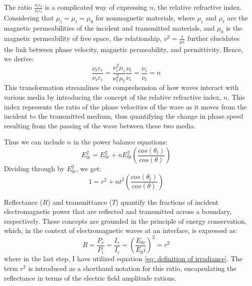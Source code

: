 The ratio $\frac{\nu_t\varepsilon_t}{\nu_i\varepsilon_i}$ is a complicated way of expressing $n$, the relative refractive index. Considering that $\mu_i = \mu_t = \mu_0$ for nonmagnetic materials, where $\mu_i$ and $\mu_t$ are the magnetic permeabilities of the incident and transmitted materials, and $\mu_0$ is the magnetic permeability of free space, the relationship, $\nu^2 = \frac{1}{\mu \varepsilon}$ further elucidates the link between phase velocity, magnetic permeability, and permittivity. Hence, we derive:
\begin{equation}
\frac{\nu_t\varepsilon_t}{\nu_i\varepsilon_i} = \frac{\nu_i^2\mu_i}{\nu_t^2\mu_t} \frac{\nu_t}{\nu_i} = \frac{\nu_i}{\nu_t} = n
\end{equation}
This transformation streamlines the comprehension of how waves interact with various media by introducing the concept of the relative refractive index, $n$. This index represents the ratio of the phase velocities of the wave as it moves from the incident to the transmitted medium, thus quantifying the change in phase speed resulting from the passing of the wave between these two media.

Thus we can include $n$ in the power balance equations:
\begin{equation}
E_{0i}^2 = E_{0r}^2 + n E_{0t}^2 \left(\frac{cos(\theta_t)}{cos(\theta)} \right)
\end{equation}
Dividing through by $E_{0i}^2$, we get:
\begin{equation} \label{power balance equation with r^2 and t^2}
1 = r^2 + n t^2 \left(\frac{cos(\theta_t)}{cos(\theta)} \right)
\end{equation}

Reflectance ($R$) and transmittance ($T$) quantify the fractions of incident electromagnetic power that are reflected and transmitted across a boundary, respectively. These concepts are grounded in the principle of energy conservation, which, in the context of electromagnetic waves at an interface, is expressed as:
\begin{equation}
    R = \frac{P_r}{P_i} = \frac{I_r}{I_i} = \left(\frac{E_{0r}}{E_0i}\right)^2 = r^2
\end{equation}
where in the last step, I have utilized equation \ref{eq: definition of irradiance}. The term $r^2$ is introduced as a shorthand notation for this ratio, encapsulating the reflectance in terms of the electric field amplitude rations.

